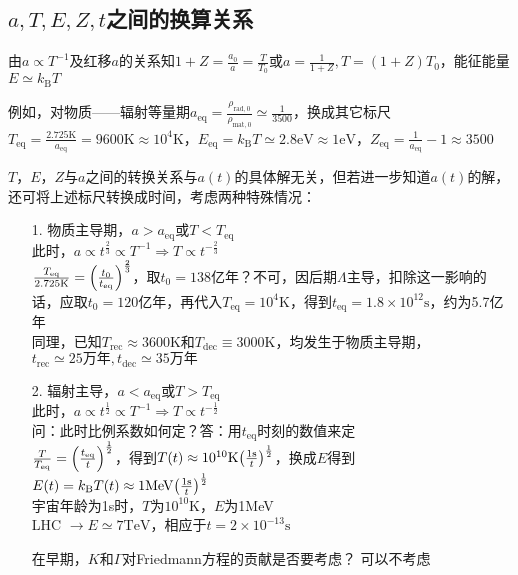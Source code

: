 \subsection{$a,T,E,Z,t$之间的换算关系}
\par 
由$a \propto T^{-1}$及红移$a$的关系知$1 + Z = \frac{a_0}{a} = \frac{T}{T_0}$或$a = \frac{1}{1 + Z}, T = (1 + Z) T_0$，能征能量$E \simeq k_{\text{B}} T$
\par 
例如，对物质——辐射等量期$a_{\text{eq}} = \frac{\rho_{\text{rad}, 0}}{\rho_{\text{mat}, 0}} \simeq \frac{1}{3500}$，换成其它标尺$T_{\text{eq}} = \frac{2.725 \mathrm{K}}{a_{\text{eq}}} = 9600 \mathrm{K} \approx 10^4 \mathrm{K}$，$E_{\text{eq}} = k_{\text{B}} T \simeq 2.8 \mathrm{eV} \approx 1 \mathrm{eV}$，$Z_{\text{eq}} = \frac{1}{a_{\text{eq}}} -1 \approx 3500$

\par 
$T$，$E$，$Z$与$a$之间的转换关系与$a(t)$的具体解无关，但若进一步知道$a(t)$的解，还可将上述标尺转换成时间，考虑两种特殊情况：
\begin{itemize}
	\item[1. ] 物质主导期，$a > a_{\text{eq}}$或$T < T_{\text{eq}}$ \\
	此时，$a \propto t^{\frac{2}{3}} \propto T^{-1} \Rightarrow T \propto t^{- \frac{2}{3}}$ \\
	$\frac{T_{\text{eq}}}{2.725 \mathrm{K}} = \qty(\frac{t_0}{t_{\text{eq}}})^{\frac{2}{3}}$，取$t_0 = 138 \text{亿年}$？不可，因后期$\Lambda$主导，扣除这一影响的话，应取$t_0 = 120 \text{亿年}$，再代入$T_{\text{eq}} = 10^4 \mathrm{K}$，得到$t_{\text{eq}} = 1.8 \times 10^{12} \mathrm{s}$，约为5.7亿年
	\\
	同理，已知$T_{\text{rec}} \approx 3600 \mathrm{K}$和$T_{\text{dec}} \equiv 3000 \mathrm{K}$，均发生于物质主导期，$t_{\text{rec}} \simeq 25 \text{万年}, t_{\text{dec}} \simeq 35 \text{万年}$
	
	\item[2. ] 辐射主导，$a < a_{\text{eq}}$或$T > T_{\text{eq}}$ \\
	此时，$a \propto t^{\frac{1}{2}} \propto T^{-1} \Rightarrow T \propto t^{- \frac{1}{2}}$ \\
	问：此时比例系数如何定？答：用$t_{\text{eq}}$时刻的数值来定 \\
	$\frac{T}{T_{\text{eq}}} = \qty(\frac{t_{\text{eq}}}{t})^{\frac{1}{2}}$，得到$T(t) \approx 10^{10} \mathrm{K} \qty(\frac{1 \mathrm{s}}{t})^{\frac{1}{2}}$，换成$E$得到$E(t) = k_{\text{B}} T(t) \approx 1 \mathrm{MeV} \qty(\frac{1 \mathrm{s}}{t})^{\frac{1}{2}}$
	\\
	宇宙年龄为1s时，$T$为$10^{10} \mathrm{K}$，$E$为1MeV\\
	LHC $\rightarrow E \simeq 7 \mathrm{TeV}$，相应于$t = 2 \times 10^{-13} \mathrm{s}$
	\begin{cbox}
		{在早期，$K$和$\Gamma$对Friedmann方程的贡献是否要考虑？}
		可以不考虑
	\end{cbox}
\end{itemize}

